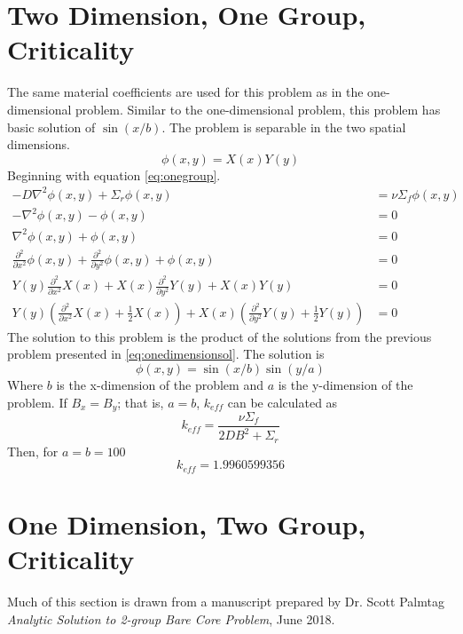 \section{Two Dimension, One Group, Criticality}
  The same material coefficients are used for this problem as in the 
  one-dimensional problem. Similar to the one-dimensional problem, this 
  problem has basic solution of $\sin(x/b)$. The problem is separable in the 
  two spatial dimensions. 
  \begin{equation}
    \phi(x,y) = X(x) Y(y) 
  \end{equation}
  Beginning with equation \eqref{eq:onegroup}.
  \begin{align}
    -D \nabla^2 \phi(x,y) + \Sigma_r \phi(x,y) &= \nu \Sigma_f \phi(x,y) \\
    - \nabla^2 \phi(x,y) - \phi(x,y) &= 0 \\
    \nabla^2 \phi(x,y) + \phi(x,y) &= 0 \\
    \frac{\partial^2}{\partial x^2} \phi(x,y) + 
      \frac{\partial^2}{\partial y^2} \phi(x,y) +
      \phi(x,y) &= 0\\
    Y(y)\frac{\partial^2}{\partial x^2}X(x) +
      X(x) \frac{\partial^2}{\partial y^2} Y(y) + X(x)Y(y) &= 0\\
    Y(y)\left(\frac{\partial^2}{\partial x^2}X(x) + \frac{1}{2} X(x)\right)+
      X(x)\left(\frac{\partial^2}{\partial y^2}Y(y) + \frac{1}{2}Y(y)
      \right) &= 0
  \end{align}
  The solution to this problem is the product of the solutions from the 
  previous problem presented in \eqref{eq:onedimensionsol}. The solution is
  \begin{equation} \label{eq:twodimensionsol}
    \phi(x,y) = \sin(x/b) \sin(y/a)
  \end{equation}
  Where $b$ is the x-dimension of the problem and $a$ is the y-dimension of 
  the problem.
  If $B_x=B_y$; that is, $a=b$,  $k_{eff}$ can be calculated as
  \begin{equation}
    k_{eff} = \frac{\nu \Sigma_f}{2DB^2 + \Sigma_r} 
  \end{equation}
  Then, for $a = b = 100$
  \[ k_{eff} = 1.9960599356 \]
\section{One Dimension, Two Group, Criticality}
  Much of this section is drawn from a manuscript prepared by Dr. Scott 
  Palmtag \textit{Analytic Solution to 2-group Bare Core Problem}, June 2018.
  
